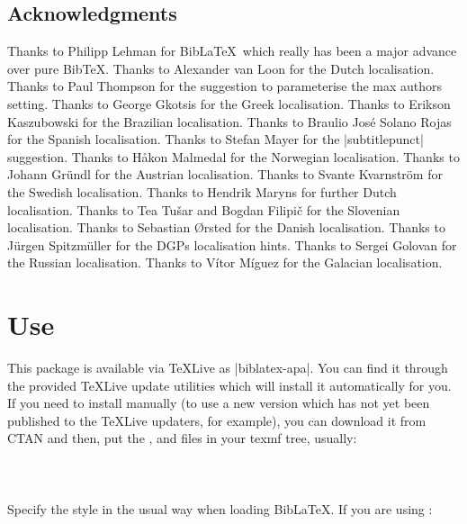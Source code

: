 \documentclass{ltxdockit}
\begin{document}
\subsection{Acknowledgments}

Thanks to Philipp Lehman for Bib\LaTeX\ which really has been a major
advance over pure Bib\TeX. Thanks to Alexander van Loon for the Dutch
localisation. Thanks to Paul Thompson for the suggestion to
parameterise the max authors setting. Thanks to George Gkotsis for the
Greek localisation. Thanks to Erikson Kaszubowski for the Brazilian
localisation. Thanks to Braulio José Solano Rojas for the Spanish
localisation. Thanks to Stefan Mayer for the |subtitlepunct| suggestion.
Thanks to Håkon Malmedal for the Norwegian localisation. Thanks to
Johann Gründl for the Austrian localisation. Thanks to Svante Kvarnström
for the Swedish localisation. Thanks to Hendrik Maryns for further Dutch
localisation. Thanks to Tea Tušar and Bogdan Filipič for the Slovenian
localisation. Thanks to Sebastian Ørsted for the Danish localisation.
Thanks to Jürgen Spitzmüller for the DGPs localisation hints. Thanks to
Sergei Golovan for the Russian localisation. Thanks to Vítor Míguez for the
Galacian localisation.

\section{Use}\label{ref:use}
\label{use}
This package is available via \TeX Live as |biblatex-apa|. You can find it
through the provided \TeX Live update utilities which will install it
automatically for you. If you need to install manually (to use a new
version which has not yet been published to the \TeX Live updaters, for
example), you can download it from CTAN and then, put the ,
 and  files in your texmf tree, usually:\\ 

\noindent{}\\
\\
\\

\noindent Specify the style in the usual way when loading Bib\LaTeX. If you
are using :

\begin{ltxcode}
\usepackage[american]{babel}
\usepackage{csquotes}
\usepackage[style=apa]{biblatex}
\end{ltxcode}
\end{document}
